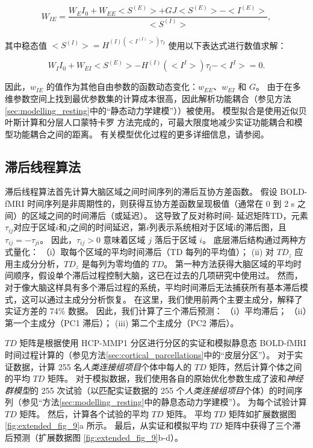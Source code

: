 \documentclass[lang=cn,a4paper,newtx,citestyle=gb7714-2015, bibstyle=gb7714-2015]{elegantpaper}
\begin{document}
\begin{equation}\label{eq:analytic_expression}
	W_{IE} = 
		\frac{
			W_E I_0 + W_{EE} <S^{(E)}> + GJ <S^{(E)}> - <I^{(E)}>
			}
			{
				<S^{(I)}>
			},
\end{equation}

其中稳态值 $ <S^{(I)}> = H^{(I) (<I^{(I)}>) \tau_I } $ 使用以下表达式进行数值求解：

\begin{equation}\label{eq:solved_expression}
	W_I I_0 
	+ W_{EI}<S^{(E)}> 
	- H^{(I)} (<I^{I}>) \tau_l
	- <I^{I}>
	= 0.
\end{equation}

因此，$ w_{IE} $ 的值作为其他自由参数的函数动态变化：$ w_{EE} $、$ w_{EI} $ 和 $ G $。
由于在多维参数空间上找到最优参数集的计算成本很高，因此解析功能耦合（参见方法\ref{sec:modelling_resting}中的“静态动力学建模”））被使用。
模型拟合是使用近似贝叶斯计算和分层人口蒙特卡罗 \cite{arnatkeviciute2021genetic,pang2022evolutionary} 方法完成的，可最大限度地减少实证功能耦合和模型功能耦合之间的距离。
有关模型优化过程的更多详细信息，请参阅\cite{rosen2022estimation}。


\subsection{滞后线程算法} \label{sec:lag_threads}

滞后线程算法首先计算大脑区域之间时间序列的滞后互协方差函数。
假设 BOLD-fMRI 时间序列是非周期性的\cite{aquino2020identifying}，则获得互协方差函数呈现极值（通常在 0 到 2 s 之间）的区域之间的时间滞后（或延迟）\cite{gajwani2022can}。
这导致了反对称时间- 延迟矩阵TD，元素$ \tau_{ij} $对应于区域$ i $和$ j $之间的时间延迟，第$ i $列表示系统相对于区域i的滞后图，且$ \tau_{ij}=- \tau_{ji} $。
因此，$ \tau_{ij}>0 $ 意味着区域 $ j $ 落后于区域 $ i $。
底层滞后结构通过两种方式量化：
（i）取每个区域的平均时间滞后（TD 每列的平均值）； 
(ii) 对 $ TD_z $ 应用主成分分析，$ TD_z $ 是每列为零均值的 $ TD $。
第一种方法获得大脑区域的平均时间顺序，假设单个滞后过程控制大脑，这已在过去的几项研究中使用过\cite{gajwani2022can,hamid2021wave,yousefi2021propagating}。
然而，对于像大脑这样具有多个滞后过程的系统，平均时间滞后无法捕获所有基本滞后模式，这可以通过主成分分析\cite{coalson2018impact}恢复。
在这里，我们使用前两个主要主成分，解释了实证方差的 74\% 数据。
因此，我们计算了三个滞后预测：
（i）平均滞后； 
（ii）第一个主成分（PC1 滞后）； (iii) 第二个主成分（PC2 滞后）。


$ TD $ 矩阵是根据使用 HCP-MMP1 分区进行分区的实证和模拟静息态 BOLD-fMRI 时间过程计算的（参见方法\ref{sec:cortical_parcellations}中的“皮层分区”）。
对于实证数据，计算 255 名\textit{人类连接组项目}个体中每人的 $ TD $ 矩阵，然后计算个体之间的平均 $ TD $ 矩阵。
对于模拟数据，我们使用各自的原始优化参数生成了波和\textit{神经群模型}的 255 次试验（以匹配实证数据的 255 个\textit{人类连接组项目}个体）的时间序列（参见“方法\ref{sec:modelling_resting}中的静息态动力学建模”）。
为每个试验计算 $ TD $ 矩阵。
然后，计算各个试验的平均 $ TD $ 矩阵。
平均 $ TD $ 矩阵如扩展数据图 \ref{fig:extended_fig_9}a 所示。
最后，从实证和模拟平均 $ TD $ 矩阵中获得了三个滞后预测（扩展数据图 \ref{fig:extended_fig_9}b-d）。
\end{document}
